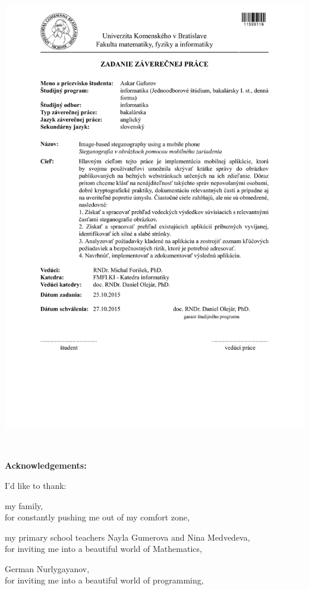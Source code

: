 \documentclass[12pt, oneside]{book}
\def\ack#1#2{#1,\\#2\smallskip}
\begin{document}
\newpage 
\thispagestyle{empty}
\hspace{-2cm}\includegraphics[width=1.1\textwidth]{images/zadanie_sk}



\frontmatter

\setcounter{page}{3}
\newpage 
~

\vfill
{\bf Acknowledgements:} 

I'd like to thank:

\ack{my family}{for constantly pushing me out of my comfort zone,}

\ack{my primary school teachers Nayla Gumerova and Nina Medvedeva}{for inviting me into 
a beautiful world of Mathematics,}

\ack{German Nurlygayanov}{for inviting me into a beautiful world of programming,}
\end{document}
